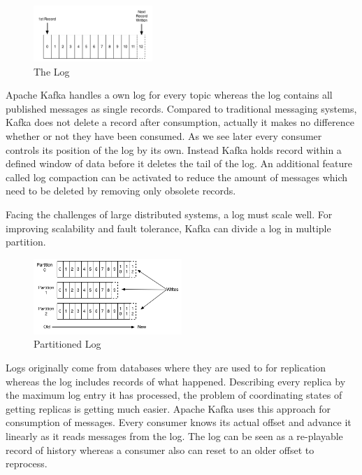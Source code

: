 \begin{figure}[H]
    \centering
    \includegraphics[width=0.4\textwidth]{images/log.png}
    \caption{The  Log \cite{JK-TheLog}}
    \label{fig:the-log}
\end{figure}

Apache Kafka handles a own log for every topic whereas the log contains all
published messages as single records. Compared to traditional messaging systems,
Kafka does not delete a record after consumption, actually it makes no difference
 whether or not they have been consumed. As we see later every consumer
controls its position of the log by its own. Instead Kafka holds record within a
defined window of data before it deletes the tail of the log. An additional
feature called log compaction can be activated to reduce the amount of messages
which need to be deleted by removing only obsolete records. \cite{apachekafka} \cite{JK-TheLog}

Facing the challenges of large distributed systems, a log must scale well. For
improving scalability and fault tolerance, Kafka can divide a log in multiple
partition. 

\begin{figure}[H]
    \centering
    \includegraphics[width=0.5\textwidth]{images/log_anatomy.png}
    \caption{Partitioned Log \cite{apachekafka}}
    \label{fig:the-log}
\end{figure}

Logs originally come from databases where they are used to for replication
whereas the log includes records of what happened. Describing every replica by
the maximum log entry it has processed, the problem of coordinating
states of getting replicas is getting much easier. Apache Kafka uses this
approach for consumption of messages. Every consumer knows its actual offset and
advance it linearly as it reads messages from the log. The log can be seen as a
re-playable record of history whereas a consumer also can reset to an older
offset to reprocess. \cite{JK-TheLog}

